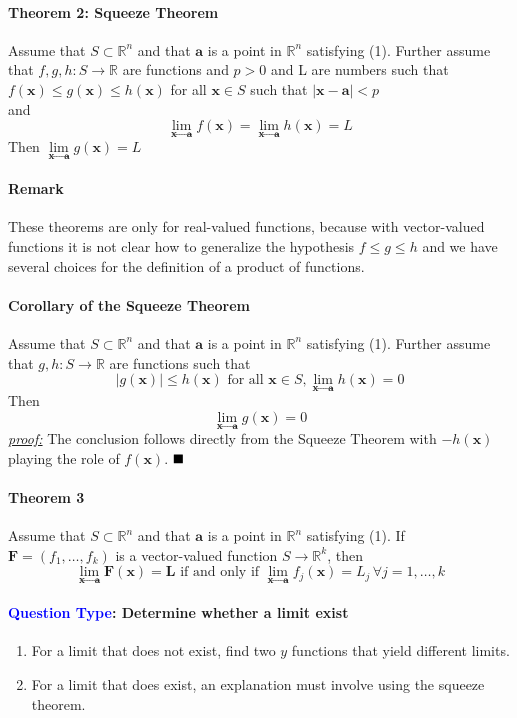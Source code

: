 \documentclass[11pt]{article}
\newcommand{\tb}[1]{\textbf{#1}}
\newcommand{\real}[0]{\mathbb{R}}
\newcommand{\proof}[0]{\textit{\underline{proof:} }}
\newcommand{\vx}[0]{\tb{x}}
\newcommand{\va}[0]{\tb{a}}
\newcommand{\vf}[0]{\tb{F}}
\newcommand{\vL}[0]{\tb{L}}
\newcommand{\qed}[0]{$\hfill\blacksquare$}
\newcommand{\lima}{\underset{\vx \rightarrow \va}{\lim}}
\begin{document}
\paragraph{Theorem 2: Squeeze Theorem}
Assume that $S \subset \real^n$ and that $\va$ is a point in $\real^n$ satisfying (1). Further assume that $f, g, h: S \rightarrow \real$ are functions and $p > 0$ and L are numbers such that \\
$f(\vx) \leq g(\vx) \leq h(\vx)$ for all $\vx \in S$ such that $|\vx - \va| < p$\\
and $$\lima f(\vx) = \lima h(\vx) = L$$
Then $\lima g(\vx) = L$
\paragraph{Remark}
These theorems are only for real-valued functions, because with vector-valued functions it is not clear how to generalize the hypothesis $f \leq g\leq h$ and we have several choices for the definition of a product of functions.
\paragraph{Corollary of the Squeeze Theorem}
Assume that $S \subset \real^n$ and that $\va$ is a point in $\real^n$ satisfying (1). Further assume that $g, h: S \rightarrow \real$ are functions such that 
$$|g(\vx)| \leq h(\vx) \mbox{ for all } \vx \in S, \lima h(\vx) = 0$$
Then
$$\lima g(\vx) = 0$$
\proof The conclusion follows directly from the Squeeze Theorem with $-h(\vx)$ playing the role of $f(\vx)$. \qed

\paragraph{Theorem 3} Assume that $S \subset \real^n$ and that $\va$ is a point in $\real^n$ satisfying (1). If $\vf = (f_1, \hdots, f_k)$ is a vector-valued function $S \rightarrow \real^k$, then
$$\lima \vf(\vx) = \vL \mbox{ if and only if } \lima f_j(\vx) = L_j \, \forall j = 1, \hdots, k$$

\paragraph{\textcolor{blue}{Question Type}: Determine whether a limit exist}
\begin{enumerate}
	\item For a limit that does not exist, find two $y$ functions that yield different limits.
	\item For a limit that does exist, an explanation must involve using the squeeze theorem.
\end{enumerate}
\end{document}
